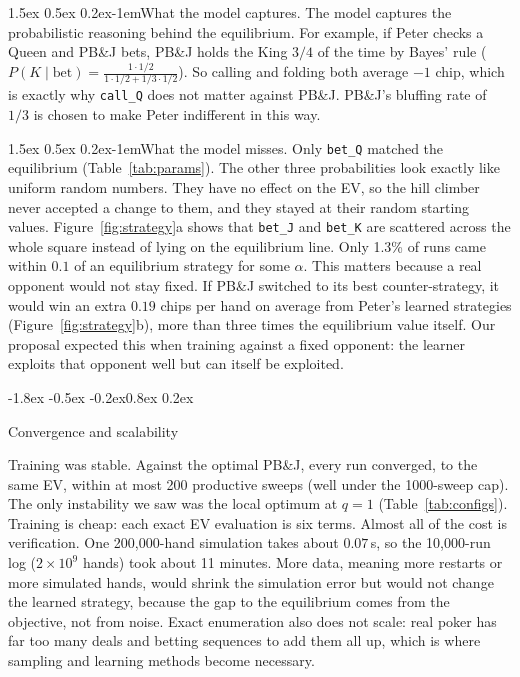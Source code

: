 \documentclass{article}
\makeatletter
\renewcommand{\subsection}{\@startsection{subsection}{2}{\z@}%
    {-1.8ex \@plus -0.5ex \@minus -0.2ex}{0.8ex \@plus 0.2ex}%
    {\normalsize\bf\raggedright}}
\renewcommand{\paragraph}{\@startsection{paragraph}{4}{\z@}%
    {1.5ex \@plus 0.5ex \@minus 0.2ex}{-1em}{\normalsize\bf}}
\newcommand{\code}[1]{\texttt{#1}}
\newcommand{\peter}{Peter}
\newcommand{\pbj}{PB\&J}
\makeatother
\begin{document}
\paragraph{What the model captures.} The model captures the probabilistic
reasoning behind the equilibrium. For example, if \peter{} checks a Queen and
\pbj{} bets, \pbj{} holds the King $3/4$ of the time by Bayes' rule
($P(K \mid \text{bet}) = \frac{1 \cdot 1/2}{1 \cdot 1/2 + 1/3 \cdot 1/2}$). So
calling and folding both average $-1$ chip, which is exactly why
\code{call\_Q} does not matter against \pbj. \pbj's bluffing rate of $1/3$ is
chosen to make \peter{} indifferent in this way.

\paragraph{What the model misses.} Only \code{bet\_Q} matched the equilibrium
(Table~\ref{tab:params}). The other three probabilities look exactly like
uniform random numbers. They have no effect on the EV, so the hill climber
never accepted a change to them, and they stayed at their random starting
values. Figure~\ref{fig:strategy}a shows that \code{bet\_J} and \code{bet\_K}
are scattered across the whole square instead of lying on the equilibrium
line. Only 1.3\% of runs came within $0.1$ of an equilibrium strategy for some
$\alpha$. This matters because a real opponent would not stay fixed. If \pbj{}
switched to its best counter-strategy, it would win an extra $0.19$ chips per
hand on average from \peter's learned strategies (Figure~\ref{fig:strategy}b),
more than three times the equilibrium value itself. Our proposal expected
this when training against a fixed opponent: the learner exploits that
opponent well but can itself be exploited.

\subsection{Convergence and scalability}

Training was stable. Against the optimal \pbj, every run converged, to the
same EV, within at most 200 productive sweeps (well under the 1000-sweep cap).
The only instability we saw was the local optimum at $q = 1$
(Table~\ref{tab:configs}). Training is cheap: each exact EV evaluation is six
terms. Almost all of the cost is verification. One 200{,}000-hand simulation
takes about $0.07$\,s, so the 10{,}000-run log ($2\times10^9$ hands) took
about 11 minutes. More data, meaning more restarts or more simulated hands,
would shrink the simulation error but would not change the learned strategy,
because the gap to the equilibrium comes from the objective, not from noise.
Exact enumeration also does not scale: real poker has far too many deals and
betting sequences to add them all up, which is where sampling and learning
methods become necessary.
\end{document}
